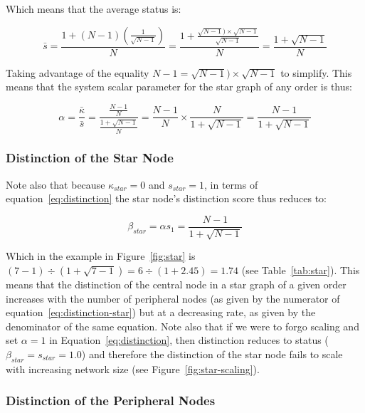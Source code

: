 \documentclass[12pt]{article}
\begin{document}
Which means that the average status is:

\begin{equation}
    \bar{s} = \frac{1 + (N-1)\left(\frac{1}{\sqrt{N-1}}\right)}{N} = \frac{1 + \frac{\sqrt{N-1}) \times \sqrt{N-1}}{\sqrt{N-1}}}{N} = \frac{1 + \sqrt{N-1}}{N}
\end{equation}

Taking advantage of the equality $N-1 = \sqrt{N-1}) \times \sqrt{N-1}$ to simplify. This means that the system scalar parameter for the star graph of any order is thus:

\begin{equation}
    \alpha = \frac{\bar{\kappa}}{\bar{s}} = \frac{\frac{N-1}{N}}{\frac{1 + \sqrt{N-1}}{N}} = \frac{N-1}{N} \times \frac{N}{1+\sqrt{N-1}} = \frac{N-1}{1 + \sqrt{N-1}}
    \label{eq:star-scalar}
\end{equation}

\subsubsection{Distinction of the Star Node}

Note also that because $\kappa_{star} = 0$ and $s_{star} = 1$, in terms of equation~\ref{eq:distinction} the star node's distinction score thus reduces to:

\begin{equation}
    \beta_{star} = \alpha s_1 = \frac{N-1}{1 + \sqrt{N-1}}
    \label{eq:distinction-star}
\end{equation}

Which in the example in Figure~\ref{fig:star} is $(7-1) \div (1 + \sqrt{7-1}) = 6 \div (1 + 2.45) = 1.74$ (see Table~\ref{tab:star}). This means that the distinction of the central node in a star graph of a given order increases with the number of peripheral nodes (as given by the numerator of equation~\ref{eq:distinction-star}) but at a decreasing rate, as given by the denominator of the same equation. Note also that if we were to forgo scaling and set $\alpha = 1$ in Equation~\ref{eq:distinction}, then distinction reduces to status ($\beta_{star} = s_{star} = 1.0$) and therefore the distinction of the star node fails to scale with increasing network size (see Figure~\ref{fig:star-scaling}). 

\subsubsection{Distinction of the Peripheral Nodes}
\end{document}
